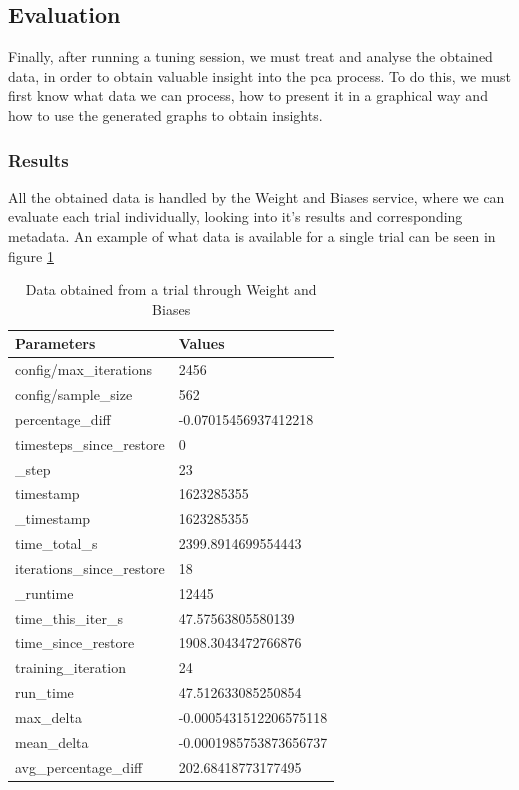 
\subsection{Evaluation}

Finally, after running a tuning session, we must treat and analyse the obtained data, in order to obtain valuable insight into the \acrshort{pca} process. To do this, we must first know what data we can process, how to present it in a graphical way and how to use the generated graphs to obtain insights.

\subsubsection{Results}

All the obtained data is handled by the Weight and Biases service, where we can evaluate each trial individually, looking into it's results and corresponding metadata. An example of what data is available for a single trial can be seen in figure \ref{tab:datapoints}

\begin{table}[ht]
\centering
\begin{tabular}{l|l}
Parameters                 & Values                 \\ \hline
config/max\_iterations     & 2456                   \\
config/sample\_size        & 562                    \\
percentage\_diff           & -0.07015456937412218   \\
timesteps\_since\_restore  & 0                      \\
\_step                     & 23                     \\
timestamp                  & 1623285355             \\
\_timestamp                & 1623285355             \\
time\_total\_s             & 2399.8914699554443     \\
iterations\_since\_restore & 18                     \\
\_runtime                  & 12445                  \\
time\_this\_iter\_s        & 47.57563805580139      \\
time\_since\_restore       & 1908.3043472766876     \\
training\_iteration        & 24                     \\
run\_time                  & 47.512633085250854     \\
max\_delta                 & -0.0005431512206575118 \\
mean\_delta                & -0.0001985753873656737 \\
avg\_percentage\_diff      & 202.68418773177495    
\end{tabular}
\caption{Data obtained from a trial through Weight and Biases}
\label{tab:datapoints}
\end{table}

